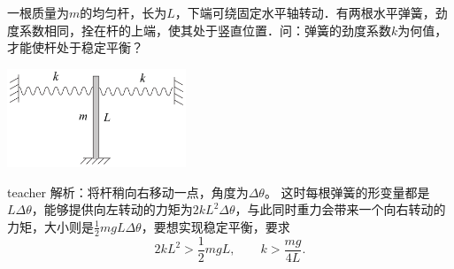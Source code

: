 \begin{example}
一根质量为$m$的均匀杆，长为$L$，下端可绕固定水平轴转动．有两根水平弹簧，劲度系数相同，拴在杆的上端，使其处于竖直位置．问：弹簧的劲度系数$k$为何值，才能使杆处于稳定平衡？
\begin{flushright}
\includegraphics[width = 0.4\textwidth]{images/static-force-23.pdf} 
\end{flushright}
\begin{taggedblock}{teacher}
\noindent
解析：将杆稍向右移动一点，角度为$\Delta \theta$。
这时每根弹簧的形变量都是$L\Delta \theta$，能够提供向左转动的力矩为$2kL^2\Delta \theta$，与此同时重力会带来一个向右转动的力矩，大小则是$\frac{1}{2}mgL\Delta\theta$，要想实现稳定平衡，要求
\[
2kL^2>\frac{1}{2}mgL,\qquad k>\frac{mg}{4L}.
\]
\end{taggedblock}
\end{example}

